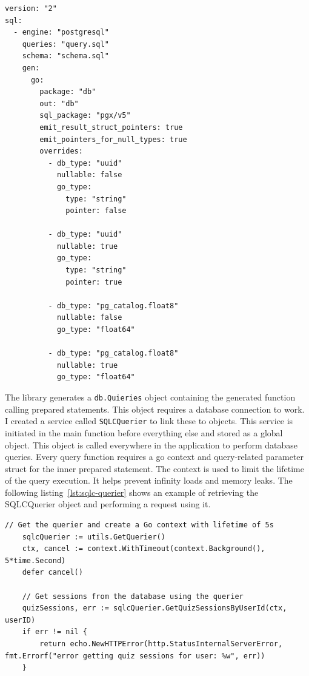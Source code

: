 \begin{lstlisting}[caption=SQLc configuration,label=lst:sqlc-config]
version: "2"
sql:
  - engine: "postgresql"
    queries: "query.sql"
    schema: "schema.sql"
    gen:
      go:
        package: "db"
        out: "db"
        sql_package: "pgx/v5"
        emit_result_struct_pointers: true
        emit_pointers_for_null_types: true
        overrides:
          - db_type: "uuid"
            nullable: false
            go_type:
              type: "string"
              pointer: false

          - db_type: "uuid"
            nullable: true
            go_type:
              type: "string"
              pointer: true

          - db_type: "pg_catalog.float8"
            nullable: false
            go_type: "float64"

          - db_type: "pg_catalog.float8"
            nullable: true
            go_type: "float64"

\end{lstlisting}

The library generates a \texttt{db.Quieries} object containing the generated function calling prepared statements. This object requires a database connection to work. I created a service called \texttt{SQLCQuerier} to link these to objects. This service is initiated in the main function before everything else and stored as a global object. This object is called everywhere in the application to perform database queries. Every query function requires a go context and query-related parameter struct for the inner prepared statement. The context is used to limit the lifetime of the query execution. It helps prevent infinity loads and memory leaks. The following listing~\ref{lst:sqlc-querier} shows an example of retrieving the SQLCQuerier object and performing a request using it.

\begin{lstlisting}[caption=Using the SQLCQuerier,label=lst:sqlc-querier]
	// Get the querier and create a Go context with lifetime of 5s
	sqlcQuerier := utils.GetQuerier()
	ctx, cancel := context.WithTimeout(context.Background(), 5*time.Second)
	defer cancel()

	// Get sessions from the database using the querier
	quizSessions, err := sqlcQuerier.GetQuizSessionsByUserId(ctx, userID)
	if err != nil {
		return echo.NewHTTPError(http.StatusInternalServerError, fmt.Errorf("error getting quiz sessions for user: %w", err))
	}
\end{lstlisting}


